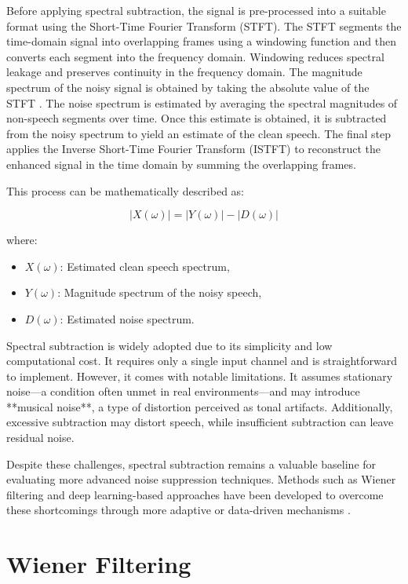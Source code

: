 Before applying spectral subtraction, the signal is pre-processed into a suitable format using the Short-Time Fourier Transform (STFT). The STFT segments the time-domain signal into overlapping frames using a windowing function and then converts each segment into the frequency domain. Windowing reduces spectral leakage and preserves continuity in the frequency domain. The magnitude spectrum of the noisy signal is obtained by taking the absolute value of the STFT \cite{dubey2016evaluation}. The noise spectrum is estimated by averaging the spectral magnitudes of non-speech segments over time. Once this estimate is obtained, it is subtracted from the noisy spectrum to yield an estimate of the clean speech. The final step applies the Inverse Short-Time Fourier Transform (ISTFT) to reconstruct the enhanced signal in the time domain by summing the overlapping frames.

This process can be mathematically described as:

\begin{equation}
    |X(\omega)| = |Y(\omega)| - |D(\omega)|
\end{equation}

where:
\begin{itemize}
    \item \( X(\omega) \): Estimated clean speech spectrum,
    \item \( Y(\omega) \): Magnitude spectrum of the noisy speech,
    \item \( D(\omega) \): Estimated noise spectrum.
\end{itemize}

Spectral subtraction is widely adopted due to its simplicity and low computational cost. It requires only a single input channel and is straightforward to implement. However, it comes with notable limitations. It assumes stationary noise—a condition often unmet in real environments—and may introduce **musical noise**, a type of distortion perceived as tonal artifacts. Additionally, excessive subtraction may distort speech, while insufficient subtraction can leave residual noise.

Despite these challenges, spectral subtraction remains a valuable baseline for evaluating more advanced noise suppression techniques. Methods such as Wiener filtering and deep learning-based approaches have been developed to overcome these shortcomings through more adaptive or data-driven mechanisms \cite{loizou2013speech}.


\section{Wiener Filtering}
\label{sec:wiener_filtering}

